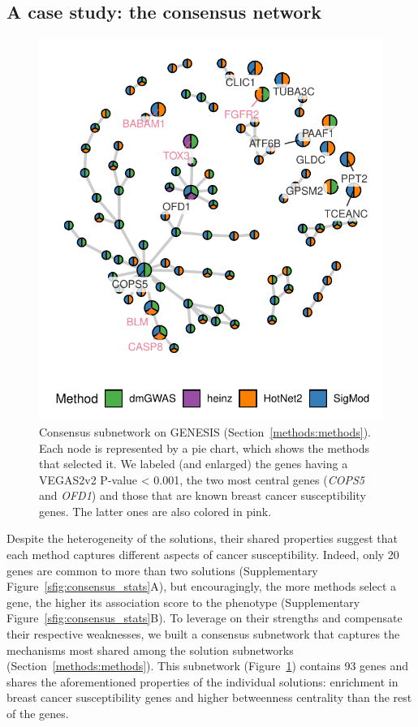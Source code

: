 \documentclass[twocolumn, 11pt]{article}
\begin{document}
\subsection{A case study: the consensus network}
\label{results:consensus}
\begin{figure}[htbp]
  \centering
  \includegraphics[width=.5\linewidth]{./figures/figure_3.pdf}
  \caption{\label{fig:consensus}
    Consensus subnetwork on GENESIS (Section~\ref{methods:methods}). Each node is represented by a pie chart, which shows the methods that selected it. We labeled (and enlarged) the genes having a VEGAS2v2 P-value < 0.001, the two most central genes (\emph{COPS5} and \emph{OFD1}) and those that are known breast cancer susceptibility genes. The latter ones are also colored in pink.}
\end{figure}

Despite the heterogeneity of the solutions, their shared properties suggest that each method captures different aspects of cancer susceptibility. Indeed, only 20 genes are common to more than two solutions (Supplementary Figure~\ref{sfig:consensus_stats}A), but encouragingly, the more methods select a gene, the higher its association score to the phenotype (Supplementary Figure~\ref{sfig:consensus_stats}B). To leverage on their strengths and compensate their respective weaknesses, we built a consensus subnetwork that captures the mechanisms most shared among the solution subnetworks (Section~\ref{methods:methods}). This subnetwork (Figure~\ref{fig:consensus}) contains 93 genes and shares the aforementioned properties of the individual solutions: enrichment in breast cancer susceptibility genes and higher betweenness centrality than the rest of the genes. 
\end{document}
